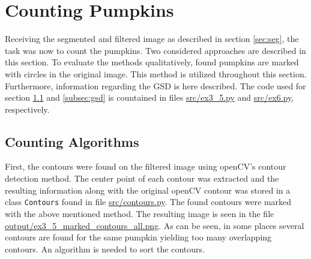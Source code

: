 \documentclass[../Head/Main.tex]{subfiles}
\begin{document}
\section{Counting Pumpkins}\label{sec:counting}
Receiving the segmented and filtered image as described in section \ref{sec:seg}, the task was now to count the pumpkins. Two considered approaches are described in this section. To evaluate the methods qualitatively, found pumpkins are marked with circles in the original image. This method is utilized throughout this section. Furthermore, information regarding the GSD is here described. The code used for section \ref{subsec:algorithms} and \ref{subsec:gsd} is countained in files \url{src/ex3_5.py} and \url{src/ex6.py}, respectively.

\subsection{Counting Algorithms}\label{subsec:algorithms}
First, the contours were found on the filtered image using openCV's contour detection method. The center point of each contour was extracted and the resulting information along with the original openCV contour was stored in a class \verb+Contours+ found in file \url{src/contours.py}. The found contours were marked with the above mentioned method. The resulting image is seen in the file \url{output/ex3_5_marked_contours_all.png}. As can be seen, in some places several contours are found for the same pumpkin yielding too many overlapping contours. An algorithm is needed to sort the contours.
\end{document}
